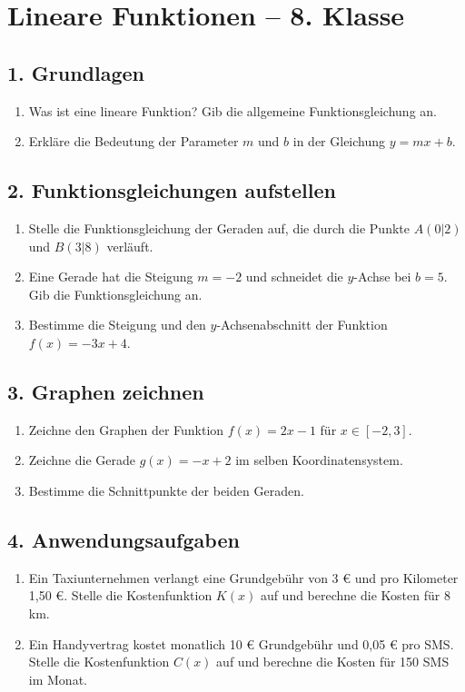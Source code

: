 
\section*{Lineare Funktionen – 8. Klasse}

\subsection*{1. Grundlagen}
\begin{enumerate}
    \item Was ist eine lineare Funktion? Gib die allgemeine Funktionsgleichung an.
    \item Erkläre die Bedeutung der Parameter $m$ und $b$ in der Gleichung $y = mx + b$.
\end{enumerate}

\subsection*{2. Funktionsgleichungen aufstellen}
\begin{enumerate}
    \item Stelle die Funktionsgleichung der Geraden auf, die durch die Punkte $A(0|2)$ und $B(3|8)$ verläuft.
    \item Eine Gerade hat die Steigung $m = -2$ und schneidet die $y$-Achse bei $b = 5$. Gib die Funktionsgleichung an.
    \item Bestimme die Steigung und den $y$-Achsenabschnitt der Funktion $f(x) = -3x + 4$.
\end{enumerate}

\subsection*{3. Graphen zeichnen}
\begin{enumerate}
    \item Zeichne den Graphen der Funktion $f(x) = 2x - 1$ für $x \in [-2, 3]$.
    \item Zeichne die Gerade $g(x) = -x + 2$ im selben Koordinatensystem.
    \item Bestimme die Schnittpunkte der beiden Geraden.
\end{enumerate}

\subsection*{4. Anwendungsaufgaben}
\begin{enumerate}
    \item Ein Taxiunternehmen verlangt eine Grundgebühr von 3 € und pro Kilometer 1,50 €. Stelle die Kostenfunktion $K(x)$ auf und berechne die Kosten für 8 km.
    \item Ein Handyvertrag kostet monatlich 10 € Grundgebühr und 0,05 € pro SMS. Stelle die Kostenfunktion $C(x)$ auf und berechne die Kosten für 150 SMS im Monat.
\end{enumerate}

